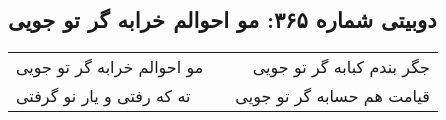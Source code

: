 \begin{center}
\section*{دوبیتی شماره ۳۶۵: مو احوالم خرابه گر تو جویی}
\label{sec:365}
\begin{longtable}{l p{0.5cm} r}
مو احوالم خرابه گر تو جویی
&&
جگر بندم کبابه گر تو جویی
\\
ته که رفتی و یار نو گرفتی
&&
قیامت هم حسابه گر تو جویی
\\
\end{longtable}
\end{center}
